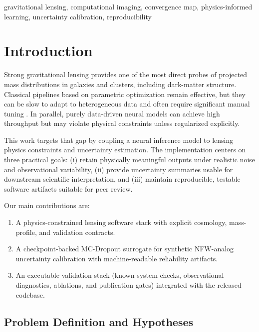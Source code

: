 \documentclass[journal]{IEEEtran}
\begin{document}
\begin{IEEEkeywords}
gravitational lensing, computational imaging, convergence map,
physics-informed learning, uncertainty calibration, reproducibility
\end{IEEEkeywords}

\section{Introduction}
\label{sec:intro}


Strong gravitational lensing provides one of the most direct probes of projected
mass distributions in galaxies and clusters, including dark-matter structure.
Classical pipelines based on parametric optimization remain effective, but they
can be slow to adapt to heterogeneous data and often require significant
manual tuning \citep{Birrer2018,Nightingale2021}. In parallel, purely data-driven
neural models can achieve high throughput but may violate physical constraints
unless regularized explicitly.

This work targets that gap by coupling a neural inference model to lensing
physics constraints and uncertainty estimation. The implementation centers on
three practical goals: (i) retain physically meaningful outputs under realistic
noise and observational variability, (ii) provide uncertainty summaries usable
for downstream scientific interpretation, and (iii) maintain reproducible,
testable software artifacts suitable for peer review.

Our main contributions are:
\begin{enumerate}
    \item A physics-constrained lensing software stack with explicit
    cosmology, mass-profile, and validation contracts.
    \item A checkpoint-backed MC-Dropout surrogate for synthetic NFW-analog
    uncertainty calibration with machine-readable reliability artifacts.
    \item An executable validation stack (known-system checks, observational
    diagnostics, ablations, and publication gates) integrated with the
    released codebase.
\end{enumerate}
\subsection{Problem Definition and Hypotheses}
\label{subsec:problem_hypotheses}
\end{document}
